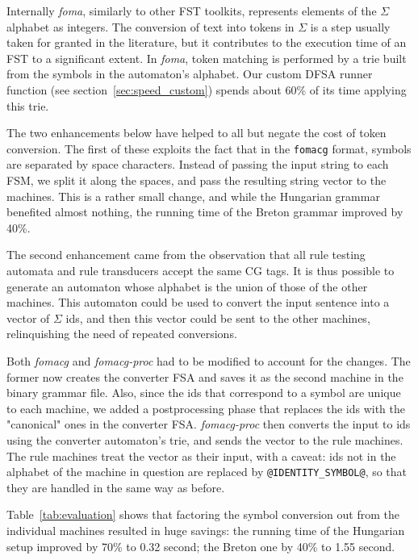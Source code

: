 \documentclass[11pt]{article}
\begin{document}
Internally \emph{foma}, similarly to other FST toolkits, represents elements
of the $\Sigma$ alphabet as integers. The conversion of text into tokens in
$\Sigma$ is a step usually taken for granted in the literature, but it
contributes to the execution time of an FST to a significant extent. In
\emph{foma}, token matching is performed by a trie built from the symbols in
the automaton's alphabet. Our custom DFSA runner function (see
section~\ref{sec:speed_custom}) spends about 60\% of its time applying this trie.

The two enhancements below have helped to all but negate the cost of token
conversion. The first of these exploits the fact that in the \texttt{fomacg}
format, symbols are separated by space characters. Instead of passing the
input string to each FSM, we split it along the spaces, and pass the resulting
string vector to the machines. This is a rather small change, and while the
Hungarian grammar benefited almost nothing, the running time of the Breton
grammar improved by 40\%.

The second enhancement came from the observation that all rule testing automata
and rule transducers accept the same CG tags. It is thus possible to generate an
automaton whose alphabet is the union of those of the other machines. This
automaton could be used to convert the input sentence into a vector of $\Sigma$
ids, and then this vector could be sent to the other machines, relinquishing the
need of repeated conversions.

Both \emph{fomacg} and \emph{fomacg-proc} had to be modified to account for the
changes. The former now creates the converter FSA and saves it as the
second machine in the binary grammar file. Also, since the ids that correspond
to a symbol are unique to each machine, we added a postprocessing phase that
replaces the ids with the "canonical" ones in the converter FSA. 
\emph{fomacg-proc} then converts the input to ids using the converter
automaton's trie, and sends the vector to the rule machines. The rule machines
treat the vector as their input, with a caveat: ids not in the alphabet of the
machine in question are replaced by \texttt{@IDENTITY\_SYMBOL@}, so that they
are handled in the same way as before.

Table~\ref{tab:evaluation} shows that factoring the symbol conversion out from
the individual machines resulted in huge savings: the running time of the
Hungarian setup improved by 70\% to 0.32 second; the Breton one by 40\% to 1.55
second.
\end{document}
